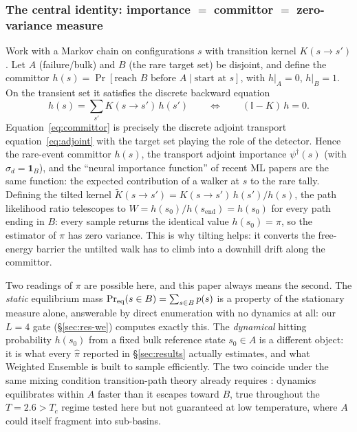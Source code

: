 \documentclass[a4paper,fleqn]{cas-sc}
\newcommand{\dg}{^{\dagger}}
\begin{document}
\subsubsection{The central identity: importance $=$ committor $=$ zero-variance measure}\label{sec:identity}
Work with a Markov chain on configurations $s$ with transition kernel $K(s\to s')$. Let $A$
(failure/bulk) and $B$ (the rare target set) be disjoint, and define the committor
$h(s)=\Pr[\text{reach }B\text{ before }A\mid\text{start at }s]$, with $h|_A=0$, $h|_B=1$.
On the transient set it satisfies the discrete backward equation
\begin{equation}
	h(s)=\sum_{s'}K(s\to s')\,h(s')\qquad\Longleftrightarrow\qquad (\mathbb I-K)\,h=0 .
	\label{eq:committor}
\end{equation}
Equation~\eqref{eq:committor} is precisely the discrete adjoint transport
equation~\eqref{eq:adjoint} with the target set playing the role of the detector. Hence the
rare-event committor $h(s)$, the transport adjoint importance $\psi\dg(s)$ (with
$\sigma_d=\mathbf 1_B$), and the ``neural importance function'' of recent ML papers are the
same function: the expected contribution of a walker at $s$ to the rare tally. Defining the
tilted kernel $\widetilde K(s\to s')=K(s\to s')\,h(s')/h(s)$, the path likelihood ratio
telescopes to $W=h(s_0)/h(s_{\text{end}})=h(s_0)$ for every path ending in $B$: every sample
returns the identical value $h(s_0)=\pi$, so the estimator of $\pi$ has zero variance.
This is why tilting helps: it converts the free-energy barrier the untilted walk has to
climb into a downhill drift along the committor.

Two readings of $\pi$ are possible here, and this paper always means the second. The
\emph{static} equilibrium mass $\Pr_{\rm eq}(s\in B)=\sum_{s\in B}p(s)$ is a property of the
stationary measure alone, answerable by direct enumeration with no dynamics at all: our
$L=4$ gate (\S\ref{sec:res-we}) computes exactly this. The \emph{dynamical} hitting
probability $h(s_0)$ from a fixed bulk reference state $s_0\in A$ is a different object: it
is what every $\hat\pi$ reported in \S\ref{sec:results} actually estimates, and what
Weighted Ensemble is built to sample efficiently. The two coincide under the same mixing
condition transition-path theory already requires \cite{e2006}: dynamics equilibrates
within $A$ faster than it escapes toward $B$, true throughout the $T=2.6>T_c$ regime tested
here but not guaranteed at low temperature, where $A$ could itself fragment into
sub-basins.
\end{document}
